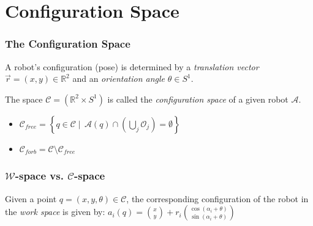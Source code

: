 \documentclass[ucs,9pt,pagenumbersfull]{beamer}
\begin{document}
\section{Configuration Space}
\begin{frame}
  \frametitle{The Configuration Space}
  A robot's configuration (pose) is determined by a \emph{translation vector} \(\vec{r}=(x,y) \in \mathbb{R}^2\) and an \emph{orientation angle} \(\theta\in S^1\).

  \begin{definition}
    The space \(\mathcal{C} = \left( \mathbb{R}^2 \times S^1 \right)\) is called the \emph{configuration space} of a given robot \(\mathcal{A}\).

    \begin{itemize}
    \item \(\mathcal{C}_{free} = \left\{ q \in \mathcal{C} \mid \,
        \mathcal{A}(q) \cap \left(\bigcup_{j} \mathcal{O}_j\right)=
        \emptyset \right\} \)
    \item \(\mathcal{C}_{forb}  = \mathcal{C} \setminus \mathcal{C}_{free}\)
    \end{itemize}
  \end{definition}
\end{frame}

\begin{frame}
  \frametitle{\(\mathcal{W}\)-space vs. \(\mathcal{C}\)-space}
  Given a point \(q=\left(x,y,\theta\right)\in \mathcal{C}\), the
  corresponding configuration of the robot in the \emph{work space} is given by: %
  \(
  a_i(q) = \binom{x}{y}+r_i \binom{\cos(\alpha_i + \theta)}{\sin(\alpha_i+\theta)}
  \)

  \begin{figure}
    \centering
    
  \end{figure}
\end{frame}
\end{document}
